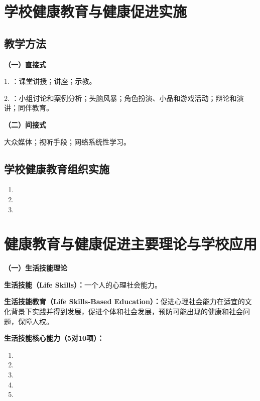 \section{学校健康教育与健康促进实施}

\subsection{教学方法}

\begin{keybox}
\textbf{（一）直接式}

1. ：课堂讲授；讲座；示教。

2. ：小组讨论和案例分析；头脑风暴；角色扮演、小品和游戏活动；辩论和演讲；同伴教育。

\textbf{（二）间接式}

大众媒体；视听手段；网络系统性学习。
\end{keybox}

\subsection{学校健康教育组织实施}

\begin{keybox}
\begin{enumerate}[leftmargin=*]
    \item {}
    \item {}
    \item {}
\end{enumerate}
\end{keybox}

\section{健康教育与健康促进主要理论与学校应用}

\begin{defbox}
\textbf{（一）生活技能理论}

\textbf{生活技能（Life Skills）：}一个人的心理社会能力。

\textbf{生活技能教育（Life Skills-Based Education）：}促进心理社会能力在适宜的文化背景下实践并得到发展，促进个体和社会发展，预防可能出现的健康和社会问题，保障人权。

\textbf{生活技能核心能力（5对10项）：}
\begin{enumerate}[leftmargin=*]
    \item {}
    \item {}
    \item {}
    \item {}
    \item {}
\end{enumerate}
\end{defbox}

